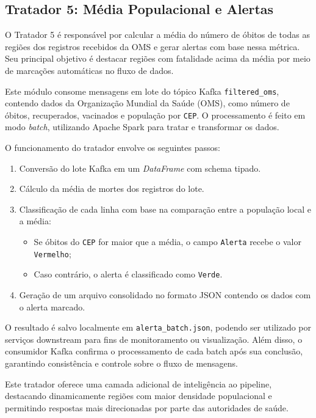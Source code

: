 \documentclass[a4paper,12pt]{article}
\begin{document}
\subsection{Tratador 5: Média Populacional e Alertas}

O Tratador 5 é responsável por calcular a média do número de óbitos de todas as regiões dos registros recebidos da OMS e gerar alertas com base nessa métrica. Seu principal objetivo é destacar regiões com fatalidade acima da média por meio de marcações automáticas no fluxo de dados.

Este módulo consome mensagens em lote do tópico Kafka \texttt{filtered\_oms}, contendo dados da Organização Mundial da Saúde (OMS), como número de óbitos, recuperados, vacinados e população por \texttt{CEP}. O processamento é feito em modo \textit{batch}, utilizando Apache Spark para tratar e transformar os dados.

O funcionamento do tratador envolve os seguintes passos:
\begin{enumerate}
    \item Conversão do lote Kafka em um \textit{DataFrame} com schema tipado.
    \item Cálculo da média de mortes dos registros do lote.
    \item Classificação de cada linha com base na comparação entre a população local e a média:
        \begin{itemize}
            \item Se óbitos do \texttt{CEP} for maior que a média, o campo \texttt{Alerta} recebe o valor \texttt{Vermelho};
            \item Caso contrário, o alerta é classificado como \texttt{Verde}.
        \end{itemize}
    \item Geração de um arquivo consolidado no formato JSON contendo os dados com o alerta marcado.
\end{enumerate}

O resultado é salvo localmente em \texttt{alerta\_batch.json}, podendo ser utilizado por serviços downstream para fins de monitoramento ou visualização. Além disso, o consumidor Kafka confirma o processamento de cada batch após sua conclusão, garantindo consistência e controle sobre o fluxo de mensagens.

Este tratador oferece uma camada adicional de inteligência ao pipeline, destacando dinamicamente regiões com maior densidade populacional e permitindo respostas mais direcionadas por parte das autoridades de saúde.
\end{document}
